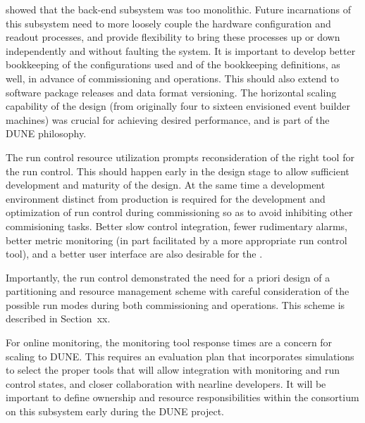  showed that the back-end subsystem was %
too monolithic. Future incarnations of
this subsystem need to more loosely couple the hardware configuration
and readout processes, and provide  %
flexibility to bring these processes up or down 
independently and without faulting the system. It is important to develop better bookkeeping of 
the configurations used and of the bookkeeping definitions, %
as well, in advance of %
commissioning and operations. This should also
extend to software package releases and data format versioning. The horizontal
scaling capability of the design (from originally four to sixteen envisioned event
builder machines) was crucial for achieving desired performance, and 
is part of the DUNE  philosophy.

The  run control resource utilization
prompts reconsideration of the right tool for the   run control. This should happen early in
the design stage to allow sufficient development and maturity of the
design. At the same time a development environment %
distinct from production is required for the %
development and optimization of run control during commissioning %
so as to avoid inhibiting other commisioning tasks. Better slow
control integration, %
fewer rudimentary alarms, %
better
metric monitoring (in part facilitated by a more appropriate run
control tool), and a better user interface %
are also %
desirable for the . %

Importantly, the  run control demonstrated the need for a priori design of a 
partitioning and resource management scheme with careful
consideration of the possible run modes during both commissioning and operations. This scheme is described in Section~xx.

For online monitoring, the monitoring tool response times are a
concern for scaling to DUNE. %
This requires an evaluation plan that incorporates simulations to select the proper tools that will allow
integration with  monitoring and run control
states,  and closer collaboration with nearline developers. It will be
important to define ownership and resource responsibilities within the
 consortium on this
subsystem early during the DUNE project.

